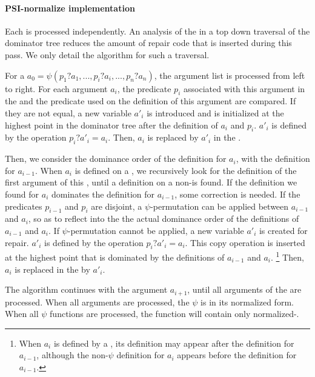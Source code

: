 \paragraph{PSI-normalize implementation}

Each \psifun is processed independently. An analysis of the
\psifuns in a top down traversal of the dominator tree
reduces the amount of repair code that is inserted during this pass. We
only detail the algorithm for such a traversal.

For a \psifun ${a_0 = \psi(p_1?a_1, ..., p_i?a_i, ...,
  p_n?a_n)}$, the argument list is processed from left to right. For
each argument ${a_i}$, the predicate ${p_i}$ associated with this argument
in the \psifun and the predicate used on the definition of
this argument are compared. If they are not equal, a new variable
${a'_i}$ is introduced and is initialized at the highest point in the
dominator tree after the definition of ${a_i}$ and ${p_i}$. ${a'_i}$ is
defined by the operation ${p_i? a'_i = a_i}$. Then, ${a_i}$ is
replaced by ${a'_i}$ in the \psifun.

Then, we consider the dominance order of the definition for ${a_i}$,
with the definition for ${a_{i-1}}$. When ${a_i}$ is defined on a
\psifun, we recursively look for the definition of the first
argument of this \psifun, until a definition on a non-\psifun is found. 
If the definition we found for ${a_i}$
dominates the definition for ${a_{i-1}}$, some correction is needed.
%
If the predicates ${p_{i-1}}$ and ${p_i}$ are disjoint, a
$\psi$-permutation can be applied between ${a_{i-1}}$ and
${a_i}$, so as to reflect into the \psifun the actual
dominance order of the definitions of ${a_{i-1}}$ and ${a_i}$.
%
If $\psi$-permutation cannot be applied, a new variable ${a'_i}$
is created for repair. ${a'_i}$ is defined by the operation
${p_i? a'_i = a_i}$. This copy operation is inserted at the highest
point that is dominated by the definitions of ${a_{i-1}}$ and
${a_i}$.
\footnote{When ${a_i}$ is defined by a \psifun, its
  definition may appear after the definition for ${a_{i-1}}$,
  although the non-$\psi$ definition for ${a_i}$ appears before
  the definition for ${a_{i-1}}$.}
Then, ${a_i}$ is replaced in the \psifun by ${a'_i}$.

The algorithm continues with the argument ${a_{i+1}}$, until all
arguments of the \psifun are processed. When all arguments
are processed, the $\psi$ is in its normalized form. When all $\psi$
functions are processed, the function will contain only
normalized-\psifuns.

